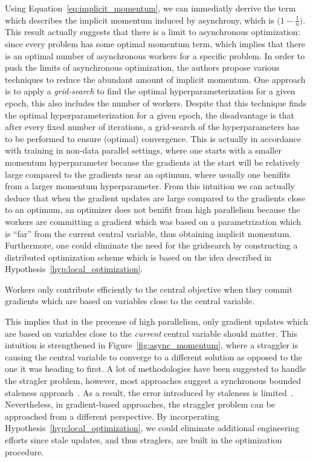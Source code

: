 Using Equation~\ref{eq:implicit_momentum}, we can immediatly derrive the term which describes the implicit momentum induced by asynchrony, which is $\big(1 - \frac{1}{n}\big)$. This result actually suggests that there is a limit to asynchronous optimization: since every problem has some optimal momentum term, which implies that there is an optimal number of asynchronous workers for a specific problem. In order to push the limits of asynchronous optimization, the authors propose various techniques to reduce the abundant amount of implicit momentum. One approach is to apply a \emph{grid-search} to find the optimal hyperparameterization for a given epoch, this also includes the number of workers. Despite that this technique finds the optimal hyperparameterization for a given epoch, the disadvantage is that after every fixed number of iterations, a grid-search of the hyperparameters has to be performed to ensure (optimal) convergence. This is actually in accordance with training in non-data parallel settings, where one starts with a smaller momentum hyperparameter because the gradients at the start will be relatively large compared to the gradients near an optimum, where usually one benifits from a larger momentum hyperparameter. From this intuition we can actually deduce that when the gradient updates are large compared to the gradients close to an optimum, an optimizer does not benifit from high parallelism because the workers are committing a gradient which was based on a parametrization which is ``far'' from the current central variable, thus obtaining implicit momentum. Furthermore, one could eliminate the need for the gridsearch by constructing a distributed optimization scheme which is based on the idea described in Hypothesis~\ref{hyp:local_optimization}.

\begin{hyp} \label{hyp:local_optimization}
  Workers only contribute efficiently to the central objective when they commit gradients which are based on variables close to the central variable.
\end{hyp}

This implies that in the precense of high parallelism, only gradient updates which are based on variables close to the \emph{current} central variable should matter. This intuition is strengthened in Figure~\ref{fig:async_momentum}, where a straggler is causing the central variable to converge to a different solution as opposed to the one it was heading to first. A lot of methodologies have been suggested to handle the stragler problem, however, most approaches suggest a synchronous bounded staleness approach~\cite{cipar2013solving, ho2013more}. As a result, the error introduced by staleness is limited~\cite{ho2013more}. Nevertheless, in gradient-based approaches, the straggler problem can be approached from a different perspective. By incorperating Hypothesis~\ref{hyp:local_optimization}, we could eliminate additional engineering efforts since stale updates, and thus straglers, are built in the optimization procedure.

